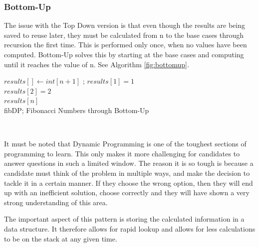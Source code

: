 \documentclass[10pt,twocolumn,hidelinks]{IEEEtran}
\begin{document}
	\subsubsection{Bottom-Up}
	The issue with the Top Down version is that even though the results are being saved to reuse later, they must be calculated from n to the base cases through recursion the first time. This is performed only once, when no values have been computed.
	Bottom-Up solves this by starting at the base cases and computing until it reaches the value of n. See Algorithm \ref{fig:bottomup}.
\IncMargin{1em}
	\begin{algorithm}
	\LinesNumbered
		$results[] \leftarrow int[n+1]$ ; $results[1] = 1$ \\ $results[2] = 2$ \\
		\Return $results[n]$\\		
		\caption{fibDP; Fibonacci Numbers through Bottom-Up}
		\label{fig:bottomup}
	\end{algorithm}\DecMargin{1em}
	\\
\par It must be noted that Dynamic Programming is one of the toughest sections of programming to learn. This only makes it more challenging for candidates to answer questions in such a limited window. The reason it is so tough is because a candidate must think of the problem in multiple ways, and make the decision to tackle it in a certain manner. If they choose the wrong option, then they will end up with an inefficient solution, choose correctly and they will have shown a very strong understanding of this area.\\
\par The important aspect of this pattern is storing the calculated information in a data structure. It therefore allows for rapid lookup and allows for less calculations to be on the stack at any given time. 
\end{document}
